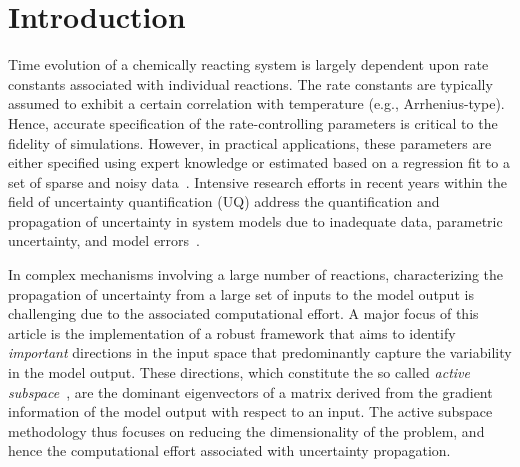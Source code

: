 \section{Introduction}
\label{sec:intro}


Time evolution of a chemically reacting system is largely dependent upon rate
constants associated with individual reactions. The rate constants are
typically assumed to exhibit a certain correlation with temperature (e.g.,
Arrhenius-type). Hence, accurate specification of the rate-controlling
parameters is critical to the fidelity of simulations. However, in practical
applications, these parameters are either specified using expert knowledge or
estimated based on a regression fit to a set of sparse and noisy
data~\cite{Burnham:1987, Burnham:1988, Vohra:2011, Sarathy:2012}.
Intensive research efforts in recent years within the field of uncertainty quantification (UQ)
address the quantification and propagation of uncertainty in system models due to 
inadequate data, parametric uncertainty, and model errors~\cite{Vohra:2014, 
Vohra:2017, Morrison:2018, Hantouche:2018, Nannapaneni:2016, Sankararaman:2015}. 

In complex mechanisms involving a large number of reactions, characterizing the
propagation of uncertainty from a large set of inputs to the model output is
challenging due to the associated computational effort.  A major focus of this
article is the implementation of a robust framework that aims to identify
\emph{important} directions in the input space that predominantly capture the
variability in the model output. These directions, which constitute the so called
\emph{active subspace}~\cite{Constantine:2015}, are the dominant eigenvectors
of a matrix derived from the gradient information of the model output with
respect to an input. The active subspace methodology thus focuses on reducing
the dimensionality of the problem, and hence the computational effort
associated with uncertainty propagation. 

